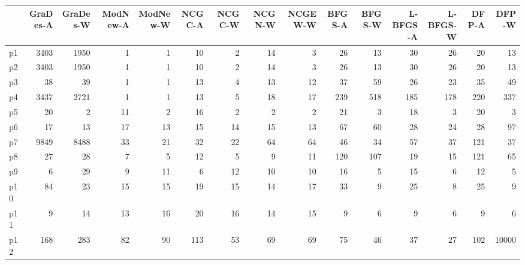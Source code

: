 \begin{tabular}{lrrrrrrrrrrrrrr}
\toprule
{} &  GraDes-A  &  GraDes-W  &  ModNew-A  &  ModNew-W  &  NCGC-A  &  NCGC-W  &  NCGN-W  &  NCGEW-W  &  BFGS-A  &  BFGS-W  &  L-BFGS-A  &  L-BFGS-W  &  DFP-A  &  DFP-W  \\
\midrule
p1  &       3403 &       1950 &          1 &          1 &       10 &        2 &       14 &         3 &       26 &       13 &         30 &         26 &      20 &      13 \\
p2  &       3403 &       1950 &          1 &          1 &       10 &        2 &       14 &         3 &       26 &       13 &         30 &         26 &      20 &      13 \\
p3  &         38 &         39 &          1 &          1 &       13 &        4 &       13 &        12 &       37 &       59 &         26 &         23 &      35 &      49 \\
p4  &       3437 &       2721 &          1 &          1 &       13 &        5 &       18 &        17 &      239 &      518 &        185 &        178 &     220 &     337 \\
p5  &         20 &          2 &         11 &          2 &       16 &        2 &        2 &         2 &       21 &        3 &         18 &          3 &      20 &       3 \\
p6  &         17 &         13 &         17 &         13 &       15 &       14 &       15 &        13 &       67 &       60 &         28 &         24 &      28 &      97 \\
p7  &       9849 &       8488 &         33 &         21 &       32 &       22 &       64 &        64 &       46 &       34 &         57 &         37 &     121 &      37 \\
p8  &         27 &         28 &          7 &          5 &       12 &        5 &        9 &        11 &      120 &      107 &         19 &         15 &     121 &      65 \\
p9  &          6 &         29 &          9 &         11 &        6 &       12 &       10 &        10 &       16 &        5 &         15 &          6 &      12 &       5 \\
p10 &         84 &         23 &         15 &         15 &       19 &       15 &       14 &        17 &       33 &        9 &         25 &          8 &      25 &       9 \\
p11 &          9 &         14 &         13 &         16 &       20 &       16 &       14 &        15 &        9 &        6 &          9 &          6 &       9 &       6 \\
p12 &        168 &        283 &         82 &         90 &      113 &       53 &       69 &        69 &       75 &       46 &         37 &         27 &     102 &   10000 \\
\bottomrule
\end{tabular}

